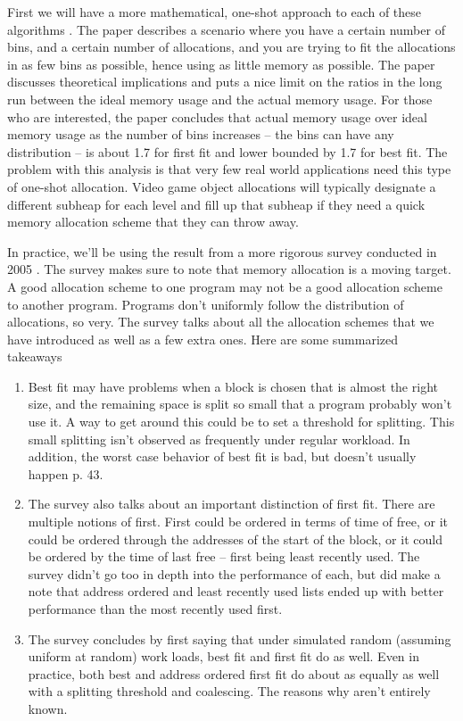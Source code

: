 First we will have a more mathematical, one-shot approach to each of these algorithms \cite{Garey:1972:WAM:800152.804907}. The paper describes a scenario where you have a certain number of bins, and a certain number of allocations, and you are trying to fit the allocations in as few bins as possible, hence using as little memory as possible.
The paper discusses theoretical implications and puts a nice limit on the ratios in the long run between the ideal memory usage and the actual memory usage.
For those who are interested, the paper concludes that actual memory usage over ideal memory usage as the number of bins increases -- the bins can have any distribution -- is about 1.7 for first fit and lower bounded by 1.7 for best fit.
The problem with this analysis is that very few real world applications need this type of one-shot allocation.
Video game object allocations will typically designate a different subheap for each level and fill up that subheap if they need a quick memory allocation scheme that they can throw away.

In practice, we'll be using the result from a more rigorous survey conducted in 2005 \cite{10.1007/3-540-60368-9_19}.
The survey makes sure to note that memory allocation is a moving target.
A good allocation scheme to one program may not be a good allocation scheme to another program.
Programs don't uniformly follow the distribution of allocations, so very.
The survey talks about all the allocation schemes that we have introduced as well as a few extra ones.
Here are some summarized takeaways

\begin{enumerate}
\item Best fit may have problems when a block is chosen that is almost the right size, and the remaining space is split so small that a program probably won't use it.
  A way to get around this could be to set a threshold for splitting.
  This small splitting isn't observed as frequently under regular workload.
  In addition, the worst case behavior of best fit is bad, but doesn't usually happen p. 43.
\item The survey also talks about an important distinction of first fit.
  There are multiple notions of first.
  First could be ordered in terms of time of free, or it could be ordered through the addresses of the start of the block, or it could be ordered by the time of last free -- first being least recently used.
  The survey didn't go too in depth into the performance of each, but did make a note that address ordered and least recently used lists ended up with better performance than the most recently used first.
\item The survey concludes by first saying that under simulated random (assuming uniform at random) work loads, best fit and first fit do as well. Even in practice, both best and address ordered first fit do about as equally as well with a splitting threshold and coalescing. The reasons why aren't entirely known.
\end{enumerate}

